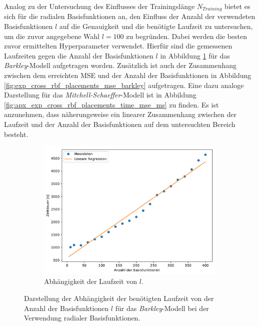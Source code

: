 Analog zu der Untersuchung des Einflusses der Trainingslänge $N_{Training}$ bietet es sich für die radialen Basisfunktionen an, den Einfluss der Anzahl der verwendeten Basisfunktionen $l$ auf die Genauigkeit und die benötigte Laufzeit zu untersuchen, um die zuvor angegebene Wahl $l=100$ zu begründen. Dabei werden die besten zuvor ermittelten Hyperparameter verwendet. Hierfür sind die gemessenen Laufzeiten gegen die Anzahl der Basisfunktionen $l$ in Abbildung \ref{fig:exp_cross_rbf_placements_time_barkley} für das \textit{Barkley}-Modell aufgetragen worden. Zusätzlich ist auch der Zusammenhang zwischen dem erreichten MSE und der Anzahl der Basisfunktionen in Abbildung \ref{fig:exp_cross_rbf_placements_mse_barkley} aufgetragen. Eine dazu analoge Darstellung für das \textit{Mitchell-Schaeffer}-Modell ist in Abbildung \ref{fig:apx_exp_cross_rbf_placements_time_mse_ms} zu finden. Es ist anzunehmen, dass näherungsweise ein linearer Zusammenhang zwischen der Laufzeit und der Anzahl der Basisfunktionen auf dem untersuchten Bereich besteht.

\begin{figure}[h]
	\centering
	\begin{subfigure}{\textwidth}
		\centering
		\includegraphics[width=4.2in]{figures/results/cross_prediction/rbf_placements_uv_time.pdf}
		\caption{Abhängigkeit der Laufzeit von $l$.}
	\end{subfigure}%
	\caption{Darstellung der Abhängigkeit der benötigten Laufzeit von der Anzahl der Basisfunktionen $l$ für das \textit{Barkley}-Modell bei der Verwendung radialer Basisfunktionen.}
	\label{fig:exp_cross_rbf_placements_time_barkley}
\end{figure}

